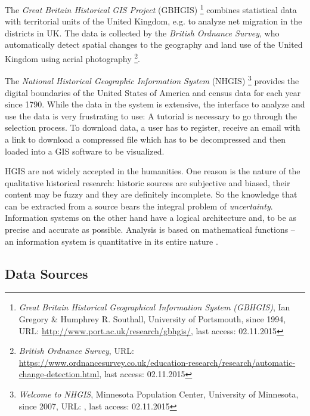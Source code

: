 
The \emph{Great Britain Historical GIS Project} (GBHGIS)
\footnote{
  \textit{Great Britain Historical Geographical Information System (GBHGIS)},
  Ian Gregory \& Humphrey R. Southall, University of Portsmouth, since 1994,
  URL: \url{http://www.port.ac.uk/research/gbhgis/},
  last access: 02.11.2015
}
combines statistical data with territorial units of the United Kingdom, e.g. to analyze net migration in the districts in UK. The data is collected by the \emph{British Ordnance Survey}, who automatically detect spatial changes to the geography and land use of the United Kingdom using aerial photography
\footnote{
  \textit{British Ordnance Survey},
  URL: \url{https://www.ordnancesurvey.co.uk/education-research/research/automatic-change-detection.html},
  last access: 02.11.2015
}.

The \emph{National Historical Geographic Information System} (NHGIS)
\footnote{
  \textit{Welcome to NHGIS},
  Minnesota Population Center, University of Minnesota,
  since 2007,
  URL: \url{},
  last access: 02.11.2015
}
provides the digital boundaries of the United States of America and census data for each year since 1790.
While the data in the system is extensive, the interface to analyze and use the data is very frustrating to use: A tutorial is necessary to go through the selection process. To download data, a user has to register, receive an email with a link to download a compressed file which has to be decompressed and then loaded into a GIS software to be visualized.

HGIS are not widely accepted in the humanities. One reason is the nature of the qualitative historical research: historic sources are subjective and biased, their content may be fuzzy and they are definitely incomplete. So the knowledge that can be extracted from a source bears the integral problem of \emph{uncertainty}. Information systems on the other hand have a logical architecture and, to be as precise and accurate as possible. Analysis is based on mathematical functions -- an information system is quantitative in its entire nature
\cite[p. 2]{knowles2008placing}.


\subsection{Data Sources} %
\label{sub:data_sources}

